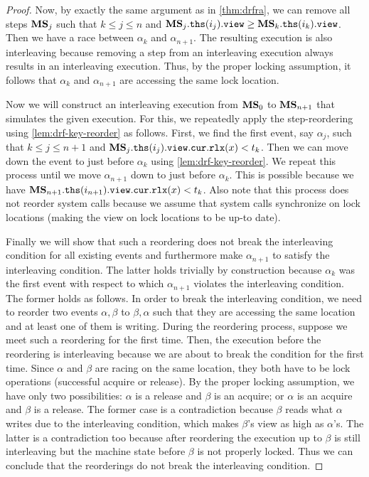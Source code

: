 \begin{proof}
Now, by exactly the same argument as in \cref{thm:drfra}, we can
remove all steps ${\mathbf{MS}}_j$ such that $k \le j\le n$ and
${\mathbf{MS}}_j.\mathtt{ths}(i_j).\texttt{view} \ge {\mathbf{MS}}_k.\mathtt{ths}(i_k).\texttt{view}$.  Then
we have a race between $\alpha_k$ and $\alpha_{n+1}$.  The resulting
execution is also interleaving because removing a step from an
interleaving execution always results in an interleaving execution.
Thus, by the proper locking assumption, it follows that
$\alpha_k$ and $\alpha_{n+1}$ are accessing the same lock location.

Now we will construct an interleaving execution from ${\mathbf{MS}}_0$ to
${\mathbf{MS}}_{n+1}$ that simulates the given execution. For this, we
repeatedly apply the step-reordering using
\cref{lem:drf-key-reorder} as follows. First, we find the first
event, say $\alpha_j$, such that $k \le j \le n+1$ and
${\mathbf{MS}}_j.\mathtt{ths}(i_j).\texttt{view}.{\texttt{cur}}.{\texttt{rlx}}(x) < t_k$.  Then we can move
down the event to just before $\alpha_{k}$ using
\cref{lem:drf-key-reorder}.  We repeat this process until we move
$\alpha_{n+1}$ down to just before $\alpha_k$.  This is possible
because we have ${{\mathbf{MS}}_{n+1}.\mathtt{ths}(i_{n+1}).\texttt{view}.{\texttt{cur}}.{\texttt{rlx}}(x) <
  t_k}$. Also note that this process does not reorder system calls
because we assume that system calls synchronize on lock
locations (\ie making the view on lock locations to be up-to date).

Finally we will show that such a reordering does not break the
interleaving condition for all existing events and furthermore make
$\alpha_{n+1}$ to satisfy the interleaving condition.  The latter
holds trivially by construction because $\alpha_k$ was the first event
with respect to which $\alpha_{n+1}$ violates the interleaving
condition. The former holds as follows. In order to break the
interleaving condition, we need to reorder two events $\alpha,\beta$
to $\beta,\alpha$ such that they are accessing the same location and
at least one of them is writing. During the reordering process,
suppose we meet such a reordering for the first time.  Then, the
execution before the reordering is interleaving because we are about
to break the condition for the first time.  Since $\alpha$ and $\beta$
are racing on the same location, they both have to be lock operations
(\ie successful acquire or release). By the proper locking assumption,
we have only two possibilities: $\alpha$ is a release and $\beta$ is an
acquire; or $\alpha$ is an acquire and $\beta$ is a release.  The
former case is a contradiction because $\beta$ reads what $\alpha$
writes due to the interleaving condition, which makes $\beta$'s view
as high as $\alpha$'s. The latter is a contradiction too because after
reordering the execution up to $\beta$ is still interleaving but the
machine state before $\beta$ is not properly locked. Thus we can
conclude that the reorderings do not break the interleaving condition.


\end{proof}
